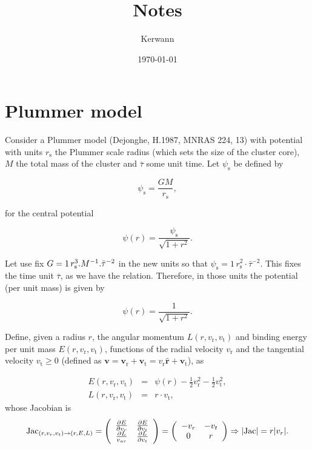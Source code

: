 \documentclass[11pt]{article}
\author{Kerwann}
\date{\today}
\title{Notes}
\newcommand{\rs}{\mathrm{s}}
\newcommand{\rt}{\mathrm{t}}
\newcommand{\rr}{\mathrm{r}}
\newcommand{\psis}{\psi_{\rs}}
\begin{document}
\maketitle

\section{Plummer model}
\label{sec:Plummer}

  Consider a Plummer model (Dejonghe, H.1987, MNRAS 224, 13) with potential
with units $r_{\rs}$ the Plummer scale radius (which sets the size
of the cluster core), $M$ the total mass of the cluster and $\bar{\tau}$
some unit time. Let $\psis$ be defined by

\begin{equation}
\psis = \frac{G M}{r_{\rs}} ,
\label{def_psi_s}
\end{equation}

for the central potential

\begin{equation}
\psi(r)=\frac{\psis}{\sqrt{1+r^{2}}} .
\label{def_potential}
\end{equation}

Let use fix $G=1\,r_{\rs}^{3}.M^{-1}.{\rm \bar{\tau}^{-2}}$ in the
new units so that $\psis=1\,r_{\rs}^{2}\cdot\bar{\tau}^{-2}$. This
fixes the time unit $\bar{\tau}$, as we have the relation. Therefore, in
those units the potential (per unit mass) is given by

\begin{equation}
\psi(r)=\frac{1}{\sqrt{1+r^{2}}} .
\label{def_potential_new_units}
\end{equation}

Define, given a radius $r$, the angular momentum $L(r,v_{\rr},v_{\rt})$
and binding energy per unit mass $E(r,v_{\rr},v_{\rt})$, functions of
the radial velocity $v_{\rr}$ and the tangential velocity $v_{\rt}\geq 0$
(defined as $\boldsymbol{v}=\boldsymbol{v_{\rr}}+\boldsymbol{v_{\rt}}=v_{\rr}\hat{\boldsymbol{r}}+\boldsymbol{v_{\rt}}$),
as

\begin{equation}
\begin{array}{ccl}
E(r,v_{\rr},v_{\rt}) & = & \psi(r)-\frac{1}{2}v_{\rr}^{2}-\frac{1}{2}v_{\rt}^{2} ,\\
L(r,v_{\rr},v_{\rt}) & = & r \cdot v_{\rt} ,
\end{array}
\label{eq:v_to_E_L}
\end{equation}
whose Jacobian is 
\begin{equation}
{\rm Jac}_{(r,v_{r},v_{t})\rightarrow(r,E,L)}=\left(\begin{array}{cc}
\frac{\partial E}{\partial v_{r}} & \frac{\partial E}{\partial v_{t}}\\
\frac{\partial L}{v_{ar}} & \frac{\partial L}{\partial v_{t}}
\end{array}\right)=\left(\begin{array}{cc}
-v_{r} & -v_{t}\\
0 & r
\end{array}\right)\Rightarrow|{\rm Jac}|=r|v_{r}| .
  \end{equation}
\end{document}
